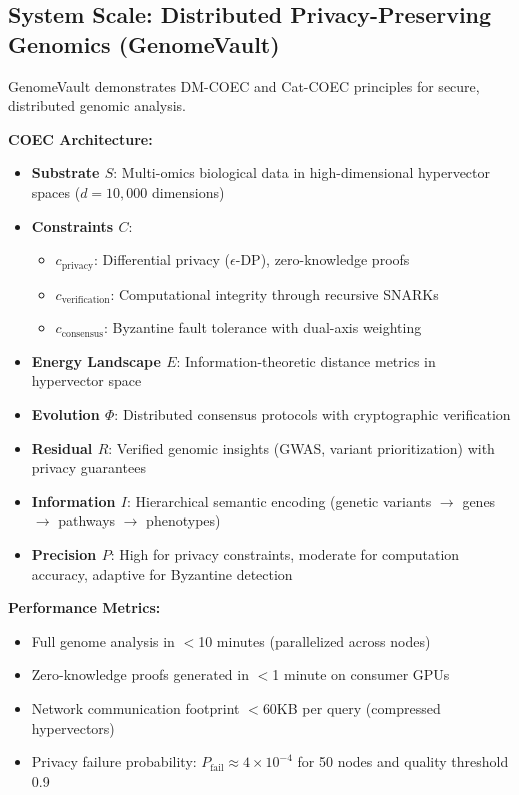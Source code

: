 \documentclass[11pt]{article}
\begin{document}
\subsection{System Scale: Distributed Privacy-Preserving Genomics (GenomeVault)}

GenomeVault demonstrates DM-COEC and Cat-COEC principles for secure, distributed genomic analysis.

\textbf{COEC Architecture:}
\begin{itemize}
\item \textbf{Substrate $S$}: Multi-omics biological data in high-dimensional hypervector spaces ($d = 10{,}000$ dimensions)
\item \textbf{Constraints $C$}:
  \begin{itemize}
  \item $c_{\text{privacy}}$: Differential privacy ($\epsilon$-DP), zero-knowledge proofs
  \item $c_{\text{verification}}$: Computational integrity through recursive SNARKs
  \item $c_{\text{consensus}}$: Byzantine fault tolerance with dual-axis weighting
  \end{itemize}
\item \textbf{Energy Landscape $E$}: Information-theoretic distance metrics in hypervector space
\item \textbf{Evolution $\Phi$}: Distributed consensus protocols with cryptographic verification
\item \textbf{Residual $R$}: Verified genomic insights (GWAS, variant prioritization) with privacy guarantees
\item \textbf{Information $I$}: Hierarchical semantic encoding (genetic variants $\to$ genes $\to$ pathways $\to$ phenotypes)
\item \textbf{Precision $P$}: High for privacy constraints, moderate for computation accuracy, adaptive for Byzantine detection
\end{itemize}

\textbf{Performance Metrics:}
\begin{itemize}
\item Full genome analysis in $<$10 minutes (parallelized across nodes)
\item Zero-knowledge proofs generated in $<$1 minute on consumer GPUs
\item Network communication footprint $<$60KB per query (compressed hypervectors)
\item Privacy failure probability: $P_{\text{fail}} \approx 4 \times 10^{-4}$ for 50 nodes and quality threshold 0.9
\end{itemize}
\end{document}
